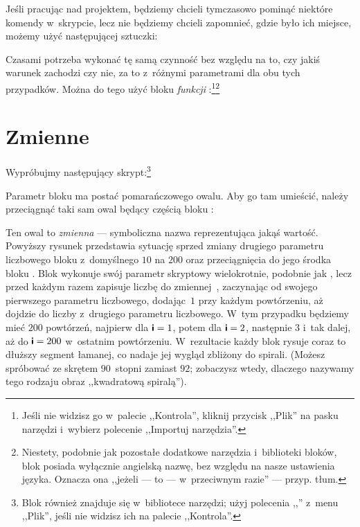 \documentclass{report}
\begin{document}
Jeśli pracując nad projektem, będziemy chcieli tymczasowo pominąć niektóre komendy w~skrypcie, lecz nie będziemy chcieli zapomnieć, gdzie było ich miejsce, możemy użyć następującej sztuczki:


Czasami potrzeba wykonać tę samą czynność bez względu na to, czy jakiś warunek zachodzi czy nie, za to z~różnymi parametrami dla obu tych przypadków. Można do tego użyć bloku \emph{funkcji} :\footnote{\onehalfspacing Jeśli nie widzisz go w~palecie ,,Kontrola'', kliknij przycisk ,,Plik''  na pasku narzędzi i~wybierz polecenie ,,Importuj narzędzia''.}\footnote{Niestety, podobnie jak pozostałe dodatkowe narzędzia i~biblioteki bloków, blok  posiada wyłącznie angielską nazwę, bez względu na nasze ustawienia języka. Oznacza ona ,,jeżeli --- to --- w~przeciwnym razie'' --- przyp. tłum.}


\section{Zmienne}

Wypróbujmy następujący skrypt:\footnote{Blok \footnotemark{} również znajduje się w~bibliotece narzędzi; użyj polecenia ,,'' z~menu ,,Plik'', jeśli nie widzisz ich na palecie ,,Kontrola''.}


Parametr bloku  ma postać pomarańczowego owalu. Aby go tam umieścić, należy przeciągnąć taki sam owal będący częścią bloku :


Ten owal to \emph{zmienna} --- symboliczna nazwa reprezentująca jakąś wartość. Powyższy rysunek przedstawia sytuację sprzed zmiany drugiego parametru liczbowego bloku  z~domyślnego $10$ na $200$ oraz przeciągnięcia do jego środka bloku . Blok  wykonuje swój parametr skryptowy wielokrotnie, podobnie jak , lecz przed każdym razem zapisuje liczbę do zmiennej~, zaczynając od swojego pierwszego parametru liczbowego, dodając~$1$ przy każdym powtórzeniu, aż dojdzie do liczby z~drugiego parametru liczbowego. W~tym przypadku będziemy mieć $200$ powtórzeń, najpierw dla $\textsf{\textbf{i}}=1$, potem dla $\textsf{\textbf{i}}=2$, następnie $3$ i~tak dalej, aż do $\textsf{\textbf{i}}=200$ w~ostatnim powtórzeniu. W~rezultacie każdy blok  rysuje coraz to dłuższy segment łamanej, co nadaje jej wygląd zbliżony do spirali. (Możesz spróbować ze skrętem $90$~stopni zamiast $92$; zobaczysz wtedy, dlaczego nazywamy tego rodzaju obraz ,,kwadratową spiralą'').
\end{document}
